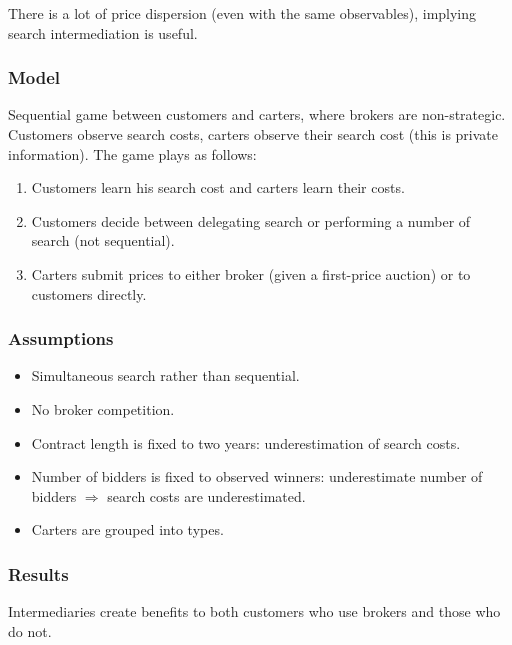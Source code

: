 There is a lot of price dispersion (even with the same observables), implying search intermediation is useful.

\subsubsection{Model}

Sequential game between customers and carters, where brokers are non-strategic. Customers observe search costs, carters observe their search cost (this is private information). The game plays as follows:\begin{enumerate}
\item Customers learn his search cost and carters learn their costs.
\item Customers decide between delegating search or performing a number of search (not sequential).
\item Carters submit prices to either broker (given a first-price auction) or to customers directly.
\end{enumerate}

\subsubsection{Assumptions}

\begin{itemize}
\item Simultaneous search rather than sequential.
\item No broker competition.
\item Contract length is fixed to two years: underestimation of search costs.
\item Number of bidders is fixed to observed winners: underestimate number of bidders $\Rightarrow$ search costs are underestimated.
\item Carters are grouped into types.
\end{itemize}

\subsubsection{Results}

Intermediaries create benefits to both customers who use brokers and those who do not. 